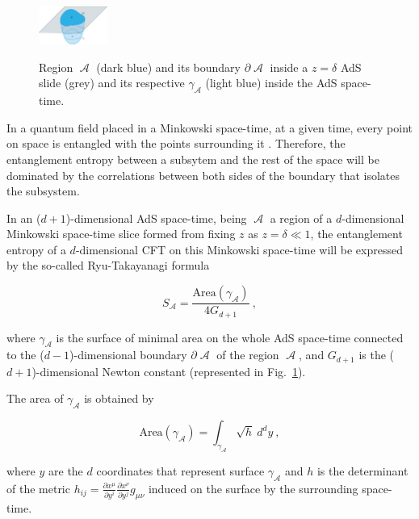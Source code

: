 \documentclass[twocolumn]{revtex4}
\providecommand{\eq}[2]{
    \begin{equation}
        #2
    \label{eq:#1}
    \end{equation}
}
\DeclareMathOperator{\calA}{\mathcal{A}}
\begin{document}
\begin{figure}
    \centering
    \includegraphics[width=0.2\textwidth]{../Imatges/Extern/EE_AdS-CFT.png}
\label{fig:EE_AdS-CFT}
\caption{Region $\calA$ (dark blue) and its boundary $\partial \calA$ inside a $z=\delta$ AdS slide (grey) and its respective $\gamma_{\calA}$ (light blue) inside the AdS space-time.}
\end{figure}

In a quantum field placed in a Minkowski space-time, at a given time, every point on space is entangled with the points surrounding it \cite{nishioka_entanglement_2018}. Therefore, the entanglement entropy between a subsytem and the rest of the space will be dominated by the correlations between both sides of the boundary that isolates the subsystem.



In an ($d+1$)-dimensional AdS space-time, being $\calA$ a region of a $d$-dimensional Minkowski space-time slice formed from fixing $z$ as $z=\delta \ll 1$, the entanglement entropy of a $d$-dimensional CFT on this Minkowski space-time will be expressed by the so-called Ryu-Takayanagi formula
\eq{EE_RT}{
    S_{\calA} = \frac{ \text{Area}(\gamma_{\calA}) }{ 4 G_{d+1} } \ ,
}
\cite{ryu_holographic_2008} where $\gamma_{\calA}$ is the surface of minimal area on the whole AdS space-time connected to the ($d-1$)-dimensional boundary $\partial \calA$ of the region $\calA$, and $G_{d+1}$ is the ($d+1$)-dimensional Newton constant (represented in Fig.~\ref{fig:EE_AdS-CFT}).

The area of $\gamma_{\calA}$ is obtained by
\eq{EE_RT-area}{
    \text{Area}(\gamma_{\calA}) = \int_{\gamma_{\calA}} \sqrt{h} \ d^{d}y \ ,
}
where $y$ are the $d$ coordinates that represent surface $\gamma_{\calA}$ and $h$ is the determinant of the metric $h_{ij} = \frac{\partial x^\mu}{\partial y^i} \frac{\partial x^\nu}{\partial y^j} g_{\mu\nu}$ induced on the surface by the surrounding space-time.
\end{document}
